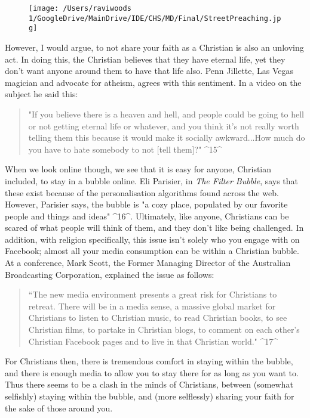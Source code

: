 \documentclass[]{article}
\begin{document}
\begin{figure}
\centering
\texttt{[image: /Users/raviwoods 1/GoogleDrive/MainDrive/IDE/CHS/MD/Final/StreetPreaching.jpg]}
\caption{}
\end{figure}

However, I would argue, to not share your faith as a Christian is also
an unloving act. In doing this, the Christian believes that they have
eternal life, yet they don't want anyone around them to have that life
also. Penn Jillette, Las Vegas magician and advocate for atheism, agrees
with this sentiment. In a video on the subject he said this:

\begin{quote}
"If you believe there is a heaven and hell, and people could be going to
hell or not getting eternal life or whatever, and you think it's not
really worth telling them this because it would make it socially
awkward...How much do you have to hate somebody to not {[}tell them{]}?"
\^{}15\^{}
\end{quote}

When we look online though, we see that it is easy for anyone, Christian
included, to stay in a bubble online. Eli Parisier, in \emph{The Filter
Bubble}, says that these exist because of the personalisation algorithms
found across the web. However, Parisier says, the bubble is "a cozy
place, populated by our favorite people and things and ideas"
\^{}16\^{}. Ultimately, like anyone, Christians can be scared of what
people will think of them, and they don't like being challenged. In
addition, with religion specifically, this issue isn't solely who you
engage with on Facebook; almost all your media consumption can be within
a Christian bubble. At a conference, Mark Scott, the Former Managing
Director of the Australian Broadcasting Corporation, explained the issue
as follows:

\begin{quote}
``The new media environment presents a great risk for Christians to
retreat. There will be in a media sense, a massive global market for
Christians to listen to Christian music, to read Christian books, to see
Christian films, to partake in Christian blogs, to comment on each
other's Christian Facebook pages and to live in that Christian world."
\^{}17\^{}
\end{quote}

For Christians then, there is tremendous comfort in staying within the
bubble, and there is enough media to allow you to stay there for as long
as you want to. Thus there seems to be a clash in the minds of
Christians, between (somewhat selfishly) staying within the bubble, and
(more selflessly) sharing your faith for the sake of those around you.
\end{document}
